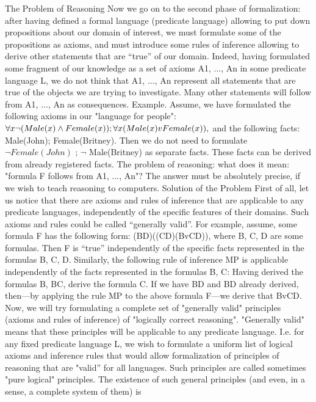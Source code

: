 The Problem of Reasoning
Now we go on to the second phase of formalization: after having defined a formal language (predicate
language) allowing to put down propositions about our domain of interest, we must formulate some of the
propositions as axioms, and must introduce some rules of inference allowing to derive other statements
that are ``true'' of our domain.
Indeed, having formulated some fragment of our knowledge as a set of axioms A1, ..., An in some
predicate language L, we do not think that A1, ..., An represent all statements that are true of the objects
we are trying to investigate. Many other statements will follow from A1, ..., An as consequences.
Example. Assume, we have formulated the following axioms in our "language for people":
\(\forall x\neg (Male(x)\wedge Female(x)); \forall x(Male(x)vFemale(x)),\) and the following facts: Male(John);
Female(Britney). Then we do not need to formulate \(\neg Female(John)\) ; \(\neg\) Male(Britney) as separate facts.
These facts can be derived from already registered facts.
The problem of reasoning: what does it mean: "formula F follows from A1, ..., An"? The answer must be
absolutely precise, if we wish to teach reasoning to computers.
Solution of the Problem
First of all, let us notice that there are axioms and rules of inference that are applicable to any predicate
languages, independently of the specific features of their domains. Such axioms and rules could be called
``generally valid''.
For example, assume, some formula F has the following form:
(B\IMPLIES D)\IMPLIES ((C\IMPLIES D)\IMPLIES (BvC\IMPLIES D)),
where B, C, D are some formulas. Then F is ``true'' independently of the specific facts represented in the
formulas B, C, D.
Similarly, the following rule of inference MP is applicable independently of the facts represented in the
formulas B, C:
Having derived the formulas B, B\IMPLIES C, derive the formula C.
If we have B\IMPLIES D and B\IMPLIES D already derived, then---by applying the rule MP to the above formula F---we
derive that BvC\IMPLIES D.
Now, we will try formulating a complete set of "generally valid" principles (axioms and rules of
inference) of "logically correct reasoning". "Generally valid" means that these principles will be
applicable to any predicate language. I.e. for any fixed predicate language L, we wish to formulate a
uniform list of logical axioms and inference rules that would allow formalization of principles of
reasoning that are "valid'' for all languages. Such principles are called sometimes "pure logical"
principles. The existence of such general principles (and even, in a sense, a complete system of them) is
